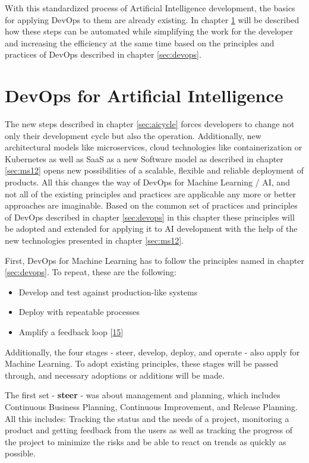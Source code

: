 \documentclass[12pt,english,a4paper,oneside,,tablecaptionabove]{scrbook}
\providecommand{\tightlist}{%
  \setlength{\itemsep}{0pt}\setlength{\parskip}{0pt}}
\begin{document}
With this standardized process of Artificial Intelligence development,
the basics for applying DevOps to them are already existing. In chapter
\ref{sec:devopsai} will be described how these steps can be automated
while simplifying the work for the developer and increasing the
efficiency at the same time based on the principles and practices of
DevOps described in chapter \ref{sec:devops}.

\hypertarget{sec:devopsai}{%
\section{DevOps for Artificial Intelligence}\label{sec:devopsai}}

The new steps described in chapter \ref{sec:aicycle} forces developers
to change not only their development cycle but also the operation.
Additionally, new architectural models like microservices, cloud
technologies like containerization or Kubernetes as well as \acs{SaaS}
as a new Software model as described in chapter \ref{sec:ms12} opens new
possibilities of a scalable, flexible and reliable deployment of
products. All this changes the way of DevOps for Machine Learning / AI,
and not all of the existing principles and practices are applicable any
more or better approaches are imaginable. Based on the common set of
practices and principles of DevOps described in chapter \ref{sec:devops}
in this chapter these principles will be adopted and extended for
applying it to AI development with the help of the new technologies
presented in chapter \ref{sec:ms12}.

First, DevOps for Machine Learning has to follow the principles named in
chapter \ref{sec:devops}. To repeat, these are the following:

\begin{itemize}
\tightlist
\item
  Develop and test against production-like systems
\item
  Deploy with repeatable processes
\item
  Amplify a feedback loop {[}\protect\hyperlink{ref-Sharma2017}{15}{]}
\end{itemize}

Additionally, the four stages - steer, develop, deploy, and operate -
also apply for Machine Learning. To adopt existing principles, these
stages will be passed through, and necessary adoptions or additions will
be made.

The first set - \textbf{steer} - was about management and planning,
which includes Continuous Business Planning, Continuous Improvement, and
Release Planning. All this includes: Tracking the status and the needs
of a project, monitoring a product and getting feedback from the users
as well as tracking the progress of the project to minimize the risks
and be able to react on trends as quickly as possible.
\end{document}
